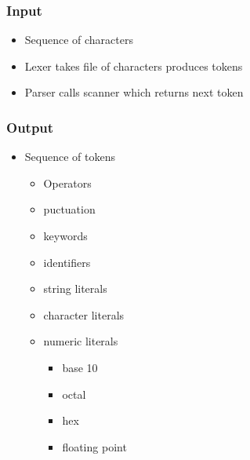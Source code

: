 \documentclass[usepdftitle=false,professionalfonts,compress ]{beamer}
\begin{document}
{
\begin{frame}\frametitle{Input}

	\begin{itemize}
	\item Sequence of characters
			\item Lexer takes file of characters produces tokens
			\item Parser calls scanner which returns next token
				\end{itemize}

\end{frame}}





{
\begin{frame}\frametitle{Output}

	\begin{itemize}
	\item Sequence of tokens

	\begin{itemize}
	\item Operators
			\item puctuation
			\item keywords
			\item identifiers
			\item string literals
			\item character literals
			\item numeric literals

	\begin{itemize}
	\item base 10
			\item octal
			\item hex
			\item floating point
				\end{itemize}

				\end{itemize}

				\end{itemize}

\end{frame}}
\end{document}
